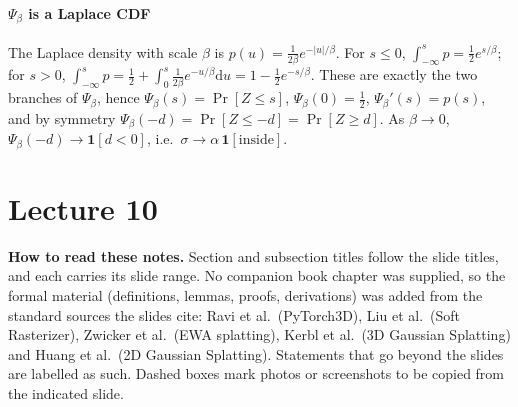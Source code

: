 \documentclass[11pt,a4paper]{article}
\theoremstyle{definition}
\theoremstyle{plain}
\theoremstyle{remark}
\begin{document}
\subsection{\texorpdfstring{$\Psi_\beta$}{Psi\_beta} is a Laplace CDF}\label{app:laplace}
The Laplace density with scale $\beta$ is $p(u)=\frac1{2\beta}e^{-|u|/\beta}$. For $s\le0$,
$\int_{-\infty}^s p=\frac12e^{s/\beta}$; for $s>0$, $\int_{-\infty}^sp=\frac12+\int_0^s\frac1{2\beta}e^{-u/\beta}\mathrm du=1-\frac12e^{-s/\beta}$.
These are exactly the two branches of $\Psi_\beta$, hence $\Psi_\beta(s)=\Pr[Z\le s]$, $\Psi_\beta(0)=\tfrac12$, $\Psi_\beta'(s)=p(s)$, and
by symmetry $\Psi_\beta(-d)=\Pr[Z\le-d]=\Pr[Z\ge d]$. As $\beta\to0$, $\Psi_\beta(-d)\to\mathbf 1[d<0]$, i.e.\ $\sigma\to\alpha\,\mathbf 1[\text{inside}]$.

\newpage

\setcounter{section}{0}
\renewcommand{\thesection}{\arabic{section}}
\part{Lecture 10}

\begin{tcolorbox}[colback=gray!5,colframe=gray!50,boxrule=0.4pt,arc=2pt]
\textbf{How to read these notes.} Section and subsection titles follow the slide titles, and each carries its slide range. No companion book chapter was supplied, so the formal material (definitions, lemmas, proofs, derivations) was added from the standard sources the slides cite: Ravi et al.\ (PyTorch3D), Liu et al.\ (Soft Rasterizer), Zwicker et al.\ (EWA splatting), Kerbl et al.\ (3D Gaussian Splatting) and Huang et al.\ (2D Gaussian Splatting). Statements that go beyond the slides are labelled as such. Dashed boxes mark photos or screenshots to be copied from the indicated slide.
\end{tcolorbox}
\end{document}
